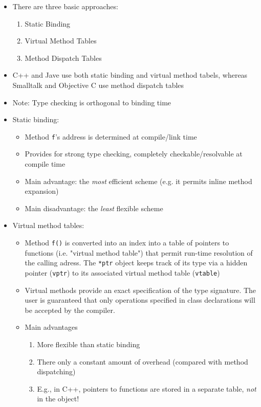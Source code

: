 \documentclass[twoside,english]{uiofysmaster}
\begin{document}
\begin{itemize}
	\begin{itemize}
		\item There are three basic approaches:
		\begin{enumerate}
			\item Static Binding
			\item Virtual Method Tables
			\item Method Dispatch Tables
		\end{enumerate}
		\item C++ and Jave use both static binding and virtual method tabels, whereas Smalltalk and Objective C use method dispatch tables
		\item Note: Type checking is orthogonal to binding time
		\item Static binding:
		\begin{itemize}
			\item Method \texttt{f}'s address is determined at compile/link time
			\item Provides for strong type checking, completely checkable/resolvable at compile time
			\item Main advantage: the \textit{most} efficient scheme (e.g. it permits inline method expansion)
			\item Main disadvantage: the \textit{least} flexible scheme
		\end{itemize}
		\item Virtual method tables:
		\begin{itemize}
			\item Method \texttt{f()} is converted into an index into a table of pointers to functions (i.e. "virtual method table") that permit run-time resolution of the calling adress. The \texttt{*ptr} object keeps track of its type via a hidden pointer (\texttt{vptr}) to its associated virtual method table (\texttt{vtable})
			\item Virtual methods provide an exact specification of the type signature. The user is guaranteed that only operations specified in class declarations will be accepted by the compiler.
			\item Main advantages
			\begin{enumerate}
				\item More flexible than static binding
				\item There only a constant amount of overhead (compared with method dispatching)
				\item E.g., in C++, pointers to functions are stored in a separate table, \textit{not} in the object!

\end{enumerate}
\end{itemize}
\end{itemize}
\end{itemize}
\end{document}
